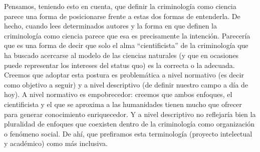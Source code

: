 \documentclass[
  spanish,
  letterpaper,
  DIV=11,
  numbers=noendperiod]{scrreprt}
\begin{document}
Pensamos, teniendo esto en cuenta, que definir la criminología como
ciencia parece una forma de posicionarse frente a estas dos formas de
entenderla. De hecho, cuando lees determinados autores y la forma en que
definen la criminología como ciencia parece que esa es precisamente la
intención. Parecería que es una forma de decir que solo el alma
``cientificista'' de la criminología que ha buscado acercarse al modelo
de las ciencias naturales (y que en ocasiones puede representar los
intereses del status quo) es la correcta o la adecuada. Creemos que
adoptar esta postura es problemática a nivel normativo (es decir como
objetivo a seguir) y a nivel descriptivo (de definir nuestro campo a día
de hoy). A nivel normativo es empobrecedor: creemos que ambos enfoques,
el cientificista y el que se aproxima a las humanidades tienen mucho que
ofrecer para generar conocimiento enriquecedor. Y a nivel descriptivo no
reflejaría bien la pluralidad de enfoques que coexisten dentro de la
criminología como organización o fenómeno social. De ahí, que prefiramos
esta terminología (proyecto intelectual y académico) como más inclusiva.
\end{document}

